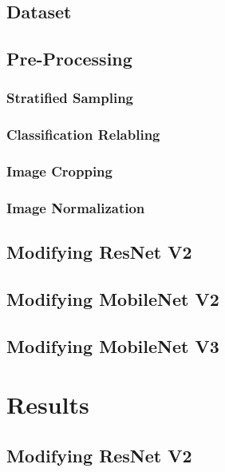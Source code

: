 \documentclass[conference]{IEEEtran}
\begin{document}
\subsection{Dataset}


\subsection{Pre-Processing}

\subsubsection{Stratified Sampling}


\subsubsection{Classification Relabling}


\subsubsection{Image Cropping}


\subsubsection{Image Normalization}

\subsection{Modifying ResNet V2}


\subsection{Modifying MobileNet V2}


\subsection{Modifying MobileNet V3}




\section{Results} %


\subsection{Modifying ResNet V2}
\end{document}
